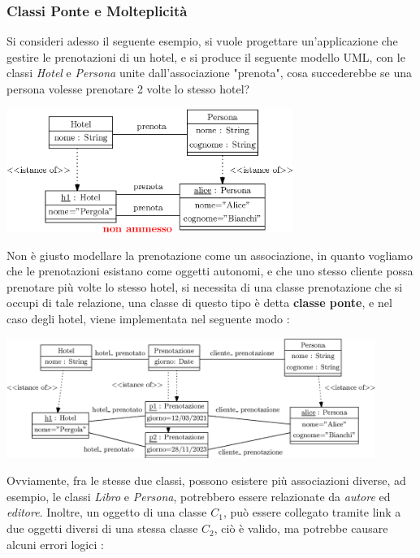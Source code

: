 \documentclass[12pt, letterpaper]{article}
\begin{document}
\subsubsection{Classi Ponte e Molteplicità}
Si consideri adesso il seguente esempio, si vuole progettare un'applicazione che gestire le prenotazioni di un 
hotel, e si produce il seguente modello UML, con le classi \textit{Hotel} e \textit{Persona} unite dall'associazione 
"prenota", cosa succederebbe se una persona volesse prenotare 2 volte lo stesso hotel? \begin{center}
    \includegraphics[width=0.7\textwidth ]{images/hotelSbagliato.eps}
\end{center}
Non è giusto modellare la prenotazione come un associazione, in quanto vogliamo che le prenotazioni esistano come 
oggetti autonomi, e che uno stesso cliente possa prenotare più volte lo stesso hotel, si necessita di una classe 
prenotazione che si occupi di tale relazione, una classe di questo tipo è detta \textbf{classe ponte}, e nel 
caso degli hotel, viene 
implementata nel seguente modo : \begin{center}
    \includegraphics[width=0.9\textwidth ]{images/hotelGiusto.eps}
\end{center}
Ovviamente, fra le stesse due classi, possono esistere più associazioni diverse, ad esempio, le classi 
\textit{Libro} e \textit{Persona}, potrebbero essere relazionate da \textit{autore} ed \textit{editore}. Inoltre, 
un oggetto di una classe \(C_1\), può essere collegato tramite link a due oggetti diversi di una stessa classe 
\(C_2\), ciò è valido, ma potrebbe causare alcuni errori logici : 
\end{document}
